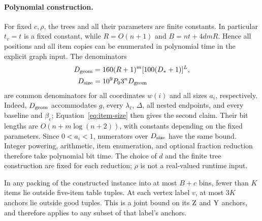 \paragraph{Polynomial construction.}
For fixed $c,\rho$, the trees and all their parameters are finite
constants. In particular $t_v=t$ is a fixed constant, while
$R=O(n+1)$ and
$B=nt+4dmR$. Hence all positions and all item copies can be enumerated
in polynomial time in the explicit graph input. The denominators
\begin{equation}\label{eq:encoding-denominators}
 \begin{aligned}
  D_{\rm geom}&=160(R+1)^m[100(D_*+1)]^L,\\
  D_{\rm size}&=10^9P_0 3^n D_{\rm geom}
 \end{aligned}
\end{equation}
are common denominators for all coordinates $w(i)$ and all sizes $a_i$,
respectively. Indeed, $D_{\rm geom}$ accommodates $g$, every
$\lambda_\ell$, $\Delta$, all nested endpoints, and every baseline and
$\beta_e$; Equation~\eqref{eq:item-size} then gives the second claim.
Their bit lengths are
$O(n+m\log(n+2))$, with constants depending on the fixed parameters.
Since $0<a_i<1$, numerators over $D_{\rm size}$ have the same bound.
Integer powering, arithmetic, item enumeration, and optional fraction
reduction therefore take polynomial bit time. The choice of $d$ and the
finite tree construction are fixed for each reduction; $\rho$ is not a
real-valued runtime input.

\begin{lemma}\label{lem:good-anchors}
In any packing of the constructed instance into at most $B+c$ bins,
fewer than $K$ items lie outside five-item table tuples. At each vertex
label $v$, at most $3K$ anchors lie outside good tuples. This is a joint
bound on its $\mathrm{Z}$ and $\mathrm{Y}$ anchors, and therefore applies to any
subset of that label's anchors.
\end{lemma}

